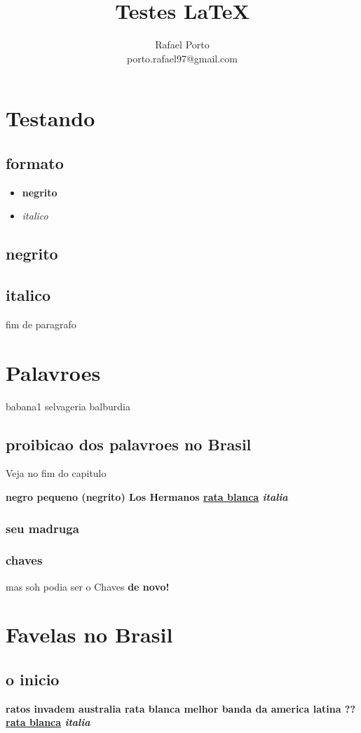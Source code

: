 \documentclass[12pt]{article}
\title{Testes \LaTeX}
\author{Rafael Porto \\ porto.rafael97@gmail.com}
\begin{document}
\chapter{Testando}
\section{formato}
\begin{itemize}
\item \textbf{negrito}
\item \textit{italico}
\end{itemize}



\section{negrito}



\section{italico}



fim de paragrafo\par
\chapter{Palavroes}
babana1
selvageria
balburdia
\section{proibicao dos palavroes no Brasil}
Veja no fim do capitulo\par
\bf{negro pequeno (negrito)} Los Hermanos 
\underline{rata blanca} \it{italia}\par
\subsection{seu madruga}
\subsection{chaves}
mas soh podia ser o Chaves 
\bf{de novo!}\par
\chapter{Favelas no Brasil}
\section{o inicio}
\bf{ratos invadem australia} rata blanca melhor banda da america latina ?? 
\underline{rata blanca} \it{italia}\par
\end{document}
